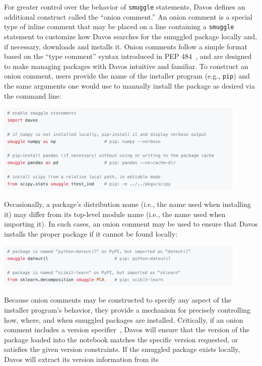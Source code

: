 \documentclass[preprint,12pt,a4paper]{elsarticle}
\begin{document}
For greater control over the behavior of \texttt{smuggle} statements, Davos
defines an additional construct called the ``onion comment.'' An onion comment
is a special type of inline comment that may be placed on a line containing a
\texttt{smuggle} statement to customize how Davos searches for the smuggled
package locally and, if necessary, downloads and installs it. Onion comments
follow a simple format based on the ``type comment'' syntax introduced in PEP
484~\cite{vanREtal14}, and are designed to make managing packages with Davos
intuitive and familiar. To construct an onion comment, users provide the name
of the installer program (e.g., \texttt{pip}) and the same arguments one would
use to manually install the package as desired via the command line:
\begin{center}
  \includegraphics[width=0.9\textwidth]{figs/snippet1}
\end{center}
Occasionally, a package's distribution name (i.e., the name used
when installing it) may differ from its top-level module name (i.e., the name
used when importing it). In such cases, an onion comment may be used to ensure
that Davos installs the proper package if it cannot be found locally:
\begin{center}
  \includegraphics[width=0.9\textwidth]{figs/snippet2}
\end{center}
Because onion comments may be constructed to specify any aspect of
the installer program's behavior, they provide a mechanism for precisely controlling
how, where, and when smuggled packages are installed. Critically, if an onion
comment includes a version specifier~\cite{CoghStuf13}, Davos will ensure that
the version of the package loaded into the notebook matches the specific
version requested, or satisfies the given version constraints. If the smuggled
package exists locally, Davos will extract its version information from its
\end{document}
